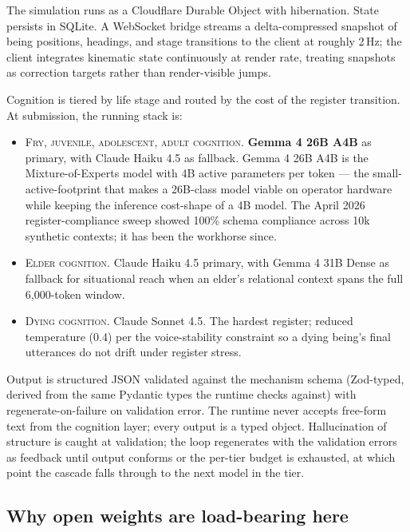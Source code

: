 \documentclass[11pt]{article}
\newcommand{\sceq}[1]{\textsc{#1}}
\begin{document}
The simulation runs as a Cloudflare Durable Object with hibernation.
State persists in SQLite. A WebSocket bridge streams a delta-compressed
snapshot of being positions, headings, and stage transitions to the
client at roughly 2\,Hz; the client integrates kinematic state
continuously at render rate, treating snapshots as correction targets
rather than render-visible jumps.

Cognition is tiered by life stage and routed by the cost of the
register transition. At submission, the running stack is:

\begin{itemize}
\item \sceq{Fry, juvenile, adolescent, adult cognition.}
  \textbf{Gemma 4 26B A4B} as primary, with Claude Haiku 4.5 as
  fallback. Gemma 4 26B A4B is the Mixture-of-Experts model with 4B
  active parameters per token --- the small-active-footprint that
  makes a 26B-class model viable on operator hardware while keeping
  the inference cost-shape of a 4B model. The April 2026
  register-compliance sweep showed 100\% schema compliance across 10k
  synthetic contexts; it has been the workhorse since.

\item \sceq{Elder cognition.} Claude Haiku 4.5 primary, with Gemma 4
  31B Dense as fallback for situational reach when an elder's
  relational context spans the full 6{,}000-token window.

\item \sceq{Dying cognition.} Claude Sonnet 4.5. The hardest register;
  reduced temperature (0.4) per the voice-stability constraint so a
  dying being's final utterances do not drift under register stress.
\end{itemize}

Output is structured JSON validated against the mechanism schema (Zod-typed,
derived from the same Pydantic types the runtime checks against) with
regenerate-on-failure on validation error. The runtime never accepts
free-form text from the cognition layer; every output is a typed object.
Hallucination of structure is caught at validation; the loop regenerates
with the validation errors as feedback until output conforms or the
per-tier budget is exhausted, at which point the cascade falls through
to the next model in the tier.

\subsection{Why open weights are load-bearing here}
\end{document}
